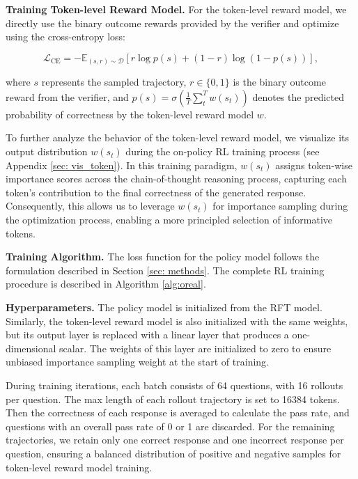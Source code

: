 \noindent\textbf{Training Token-level Reward Model.} For the token-level reward model, we directly use the binary outcome rewards provided by the verifier and optimize using the cross-entropy loss:  

\begin{equation}
\mathcal{L}_{\text{CE}} = - \mathbb{E}_{(s, r) \sim \mathcal{D}} \left[ r \log p(s) + (1 - r) \log (1 - p(s)) \right],
\label{eq: ce}
\end{equation}

where $s$ represents the sampled trajectory, $ r \in \{0,1\}$  is the binary outcome reward from the verifier, and $p(s) = \sigma(\frac{1}{T}\sum_{t}^{T} w(s_{t}))$ denotes the predicted probability of correctness by the token-level reward model $w$.

To further analyze the behavior of the token-level reward model, we visualize its output distribution $w(s_{t})$ during the on-policy RL training process (see Appendix \ref{sec: vis_token}). In this training paradigm, $w(s_{t})$ assigns token-wise importance scores across the chain-of-thought reasoning process, capturing each token's contribution to the final correctness of the generated response. Consequently, this allows us to leverage $w(s_{t})$ for importance sampling during the optimization process, enabling a more principled selection of informative tokens. 

\noindent\textbf{Training Algorithm.} 
The loss function for the policy model follows the formulation described in Section \ref{sec: methods}. 
The complete RL training procedure is described in Algorithm \ref{alg:oreal}.



\noindent\textbf{Hyperparameters.} 
The policy model is initialized from the RFT model. Similarly, the token-level reward model is also initialized with the same weights, but its output layer is replaced with a linear layer that produces a one-dimensional scalar. The weights of this layer are initialized to zero to ensure unbiased importance sampling weight at the start of training.  

During training iterations, each batch consists of 64 questions, with 16 rollouts per question. The max length of each rollout trajectory is set to 16384 tokens. Then the correctness of each response is averaged to calculate the pass rate, and questions with an overall pass rate of 0 or 1 are discarded. For the remaining trajectories, we retain only one correct response and one incorrect response per question, ensuring a balanced distribution of positive and negative samples for token-level reward model training. 

